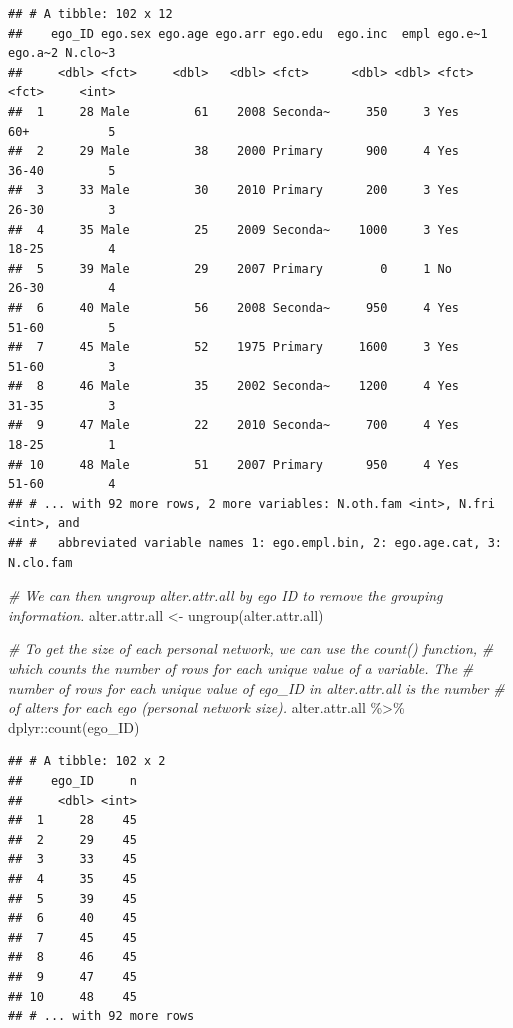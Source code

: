 \documentclass[
]{book}
\newenvironment{Shaded}{\begin{snugshade}}{\end{snugshade}}
\newcommand{\CommentTok}[1]{\textcolor[rgb]{0.56,0.35,0.01}{\textit{#1}}}
\newcommand{\FunctionTok}[1]{\textcolor[rgb]{0.00,0.00,0.00}{#1}}
\newcommand{\NormalTok}[1]{#1}
\newcommand{\OtherTok}[1]{\textcolor[rgb]{0.56,0.35,0.01}{#1}}
\newcommand{\SpecialCharTok}[1]{\textcolor[rgb]{0.00,0.00,0.00}{#1}}
\begin{document}
\begin{verbatim}
## # A tibble: 102 x 12
##    ego_ID ego.sex ego.age ego.arr ego.edu  ego.inc  empl ego.e~1 ego.a~2 N.clo~3
##     <dbl> <fct>     <dbl>   <dbl> <fct>      <dbl> <dbl> <fct>   <fct>     <int>
##  1     28 Male         61    2008 Seconda~     350     3 Yes     60+           5
##  2     29 Male         38    2000 Primary      900     4 Yes     36-40         5
##  3     33 Male         30    2010 Primary      200     3 Yes     26-30         3
##  4     35 Male         25    2009 Seconda~    1000     3 Yes     18-25         4
##  5     39 Male         29    2007 Primary        0     1 No      26-30         4
##  6     40 Male         56    2008 Seconda~     950     4 Yes     51-60         5
##  7     45 Male         52    1975 Primary     1600     3 Yes     51-60         3
##  8     46 Male         35    2002 Seconda~    1200     4 Yes     31-35         3
##  9     47 Male         22    2010 Seconda~     700     4 Yes     18-25         1
## 10     48 Male         51    2007 Primary      950     4 Yes     51-60         4
## # ... with 92 more rows, 2 more variables: N.oth.fam <int>, N.fri <int>, and
## #   abbreviated variable names 1: ego.empl.bin, 2: ego.age.cat, 3: N.clo.fam
\end{verbatim}

\begin{Shaded}
\begin{Highlighting}[]
\CommentTok{\# We can then ungroup alter.attr.all by ego ID to remove the grouping information.}
\NormalTok{alter.attr.all }\OtherTok{\textless{}{-}} \FunctionTok{ungroup}\NormalTok{(alter.attr.all)}

\CommentTok{\# To get the size of each personal network, we can use the count() function,}
\CommentTok{\# which counts the number of rows for each unique value of a variable. The}
\CommentTok{\# number of rows for each unique value of ego\_ID in alter.attr.all is the number}
\CommentTok{\# of alters for each ego (personal network size).}
\NormalTok{alter.attr.all }\SpecialCharTok{\%\textgreater{}\%} 
\NormalTok{  dplyr}\SpecialCharTok{::}\FunctionTok{count}\NormalTok{(ego\_ID)}
\end{Highlighting}
\end{Shaded}

\begin{verbatim}
## # A tibble: 102 x 2
##    ego_ID     n
##     <dbl> <int>
##  1     28    45
##  2     29    45
##  3     33    45
##  4     35    45
##  5     39    45
##  6     40    45
##  7     45    45
##  8     46    45
##  9     47    45
## 10     48    45
## # ... with 92 more rows
\end{verbatim}
\end{document}
